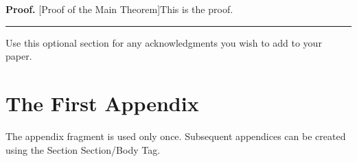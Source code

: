 \documentclass[aps,preprint]{revtex4}%
\newenvironment{proof}[1][Proof]{\noindent\textbf{#1.} }{\ \rule{0.5em}{0.5em}}
\begin{document}
\begin{proof}
[Proof of the Main Theorem]This is the proof.
\end{proof}

\begin{acknowledgments}
Use this optional section for any acknowledgments you wish to add to your paper.
\end{acknowledgments}

\appendix


\section{The First Appendix}

The appendix fragment is used only once. Subsequent appendices can be created
using the Section Section/Body Tag.
\end{document}
